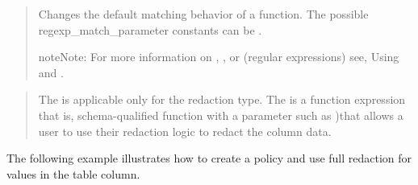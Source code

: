 \documentclass[letterpaper,10pt,english,openany,oneside]{sphinxmanual}
\begin{document}
\begin{quote}

Changes the default matching behavior of a function. The possible
regexp\_match\_parameter constants can be .

\begin{sphinxadmonition}{note}{Note:}
For more information on , , or  (regular expressions) see, Using  and .
\end{sphinxadmonition}
\end{quote}

\begin{quote}

The  is applicable only for the 
redaction type. The  is a function
expression that is, schema-qualified function with a parameter such as
)that allows a user to use
their redaction logic to redact the column data.
\end{quote}


The following example illustrates how to create a policy and use full
redaction for values in the  table 
column.
\end{document}
